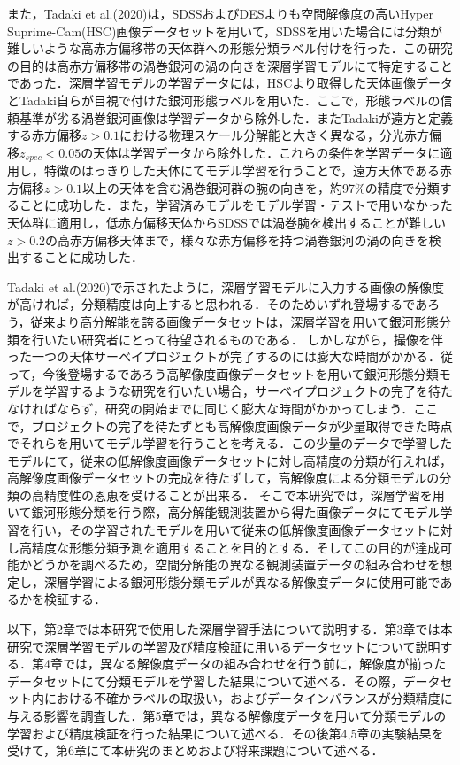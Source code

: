 \documentclass[a4j, 11pt]{jreport}
\begin{document}
また，Tadaki et al.(2020)\cite{Tadaki2020}は，SDSSおよびDESよりも空間解像度の高いHyper Suprime-Cam(HSC)画像データセットを用いて，SDSSを用いた場合には分類が難しいような高赤方偏移帯の天体群への形態分類ラベル付けを行った．この研究の目的は高赤方偏移帯の渦巻銀河の渦の向きを深層学習モデルにて特定することであった．深層学習モデルの学習データには，HSCより取得した天体画像データとTadaki自らが目視で付けた銀河形態ラベルを用いた．ここで，形態ラベルの信頼基準が劣る渦巻銀河画像は学習データから除外した．またTadakiが遠方と定義する赤方偏移$z>0.1$における物理スケール分解能と大きく異なる，分光赤方偏移$z_{spec} < 0.05$の天体は学習データから除外した．これらの条件を学習データに適用し，特徴のはっきりした天体にてモデル学習を行うことで，遠方天体である赤方偏移$z>0.1$以上の天体を含む渦巻銀河群の腕の向きを，約97\%の精度で分類することに成功した．また，学習済みモデルをモデル学習・テストで用いなかった天体群に適用し，低赤方偏移天体からSDSSでは渦巻腕を検出することが難しい$z>0.2$の高赤方偏移天体まで，様々な赤方偏移を持つ渦巻銀河の渦の向きを検出することに成功した．

Tadaki et al.(2020)で示されたように，深層学習モデルに入力する画像の解像度が高ければ，分類精度は向上すると思われる．そのためいずれ登場するであろう，従来より高分解能を誇る画像データセットは，深層学習を用いて銀河形態分類を行いたい研究者にとって待望されるものである．
しかしながら，撮像を伴った一つの天体サーベイプロジェクトが完了するのには膨大な時間がかかる．従って，今後登場するであろう高解像度画像データセットを用いて銀河形態分類モデルを学習するような研究を行いたい場合，サーベイプロジェクトの完了を待たなければならず，研究の開始までに同じく膨大な時間がかかってしまう．ここで，プロジェクトの完了を待たずとも高解像度画像データが少量取得できた時点でそれらを用いてモデル学習を行うことを考える．この少量のデータで学習したモデルにて，従来の低解像度画像データセットに対し高精度の分類が行えれば，高解像度画像データセットの完成を待たずして，高解像度による分類モデルの分類の高精度性の恩恵を受けることが出来る．
そこで本研究では，深層学習を用いて銀河形態分類を行う際，高分解能観測装置から得た画像データにてモデル学習を行い，その学習されたモデルを用いて従来の低解像度画像データセットに対し高精度な形態分類予測を適用することを目的とする．そしてこの目的が達成可能かどうかを調べるため，空間分解能の異なる観測装置データの組み合わせを想定し，深層学習による銀河形態分類モデルが異なる解像度データに使用可能であるかを検証する．

以下，第2章では本研究で使用した深層学習手法について説明する．第3章では本研究で深層学習モデルの学習及び精度検証に用いるデータセットについて説明する．第4章では，異なる解像度データの組み合わせを行う前に，解像度が揃ったデータセットにて分類モデルを学習した結果について述べる．その際，データセット内における不確かラベルの取扱い，およびデータインバランスが分類精度に与える影響を調査した．第5章では，異なる解像度データを用いて分類モデルの学習および精度検証を行った結果について述べる．その後第4,5章の実験結果を受けて，第6章にて本研究のまとめおよび将来課題について述べる．
\end{document}
